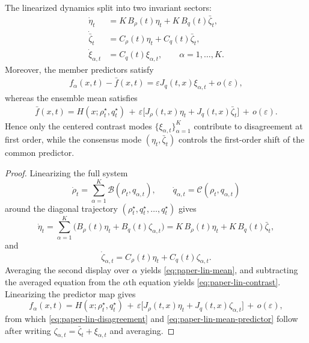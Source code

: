 \begin{theorem}
\label{thm:paper-consensus-contrast}
The linearized dynamics split into two invariant sectors:
\begin{align}
\dot\eta_t
&=
K\,B_\rho(t)\eta_t + K\,B_q(t)\bar\zeta_t,
\label{eq:paper-lin-rho}\\
\dot{\bar\zeta}_t
&=
C_\rho(t)\eta_t + C_q(t)\bar\zeta_t,
\label{eq:paper-lin-mean}\\
\dot\xi_{\alpha,t}
&=
C_q(t)\xi_{\alpha,t},
\qquad
\alpha=1,\dots,K.
\label{eq:paper-lin-contrast}
\end{align}
Moreover, the member predictors satisfy
\begin{align}
f_\alpha(x,t)-\bar f(x,t)
=
\varepsilon J_q(t,x)\xi_{\alpha,t} + o(\varepsilon),
\label{eq:paper-lin-disagreement}
\end{align}
whereas the ensemble mean satisfies
\begin{align}
\bar f(x,t)
=
H(x;\rho_t^\star,q_t^\star)
\,+\,
\varepsilon\bigl[J_\rho(t,x)\eta_t + J_q(t,x)\bar\zeta_t\bigr]
\,+\,
o(\varepsilon).
\label{eq:paper-lin-mean-predictor}
\end{align}
Hence only the centered contrast modes $\{\xi_{\alpha,t}\}_{\alpha=1}^K$ contribute to disagreement at first order, while the consensus mode $(\eta_t,\bar\zeta_t)$ controls the first-order shift of the common predictor.
\end{theorem}

\begin{proof}
Linearizing the full system
\[
\dot\rho_t = \sum_{\alpha=1}^K \mathcal B(\rho_t,q_{\alpha,t}),
\qquad
\dot q_{\alpha,t} = \mathcal C(\rho_t,q_{\alpha,t})
\]
around the diagonal trajectory $(\rho_t^\star,q_t^\star,\dots,q_t^\star)$ gives
\[
\dot\eta_t
=
\sum_{\alpha=1}^K \bigl(B_\rho(t)\eta_t + B_q(t)\zeta_{\alpha,t}\bigr)
=
K\,B_\rho(t)\eta_t + K\,B_q(t)\bar\zeta_t,
\]
and
\[
\dot\zeta_{\alpha,t}
=
C_\rho(t)\eta_t + C_q(t)\zeta_{\alpha,t}.
\]
Averaging the second display over $\alpha$ yields \eqref{eq:paper-lin-mean}, and subtracting the averaged equation from the $\alpha$th equation yields \eqref{eq:paper-lin-contrast}. Linearizing the predictor map gives
\[
f_\alpha(x,t)
=
H(x;\rho_t^\star,q_t^\star)
\,+\,
\varepsilon\bigl[J_\rho(t,x)\eta_t + J_q(t,x)\zeta_{\alpha,t}\bigr]
\,+\,
o(\varepsilon),
\]
from which \eqref{eq:paper-lin-disagreement} and \eqref{eq:paper-lin-mean-predictor} follow after writing $\zeta_{\alpha,t}=\bar\zeta_t+\xi_{\alpha,t}$ and averaging.
\end{proof}


